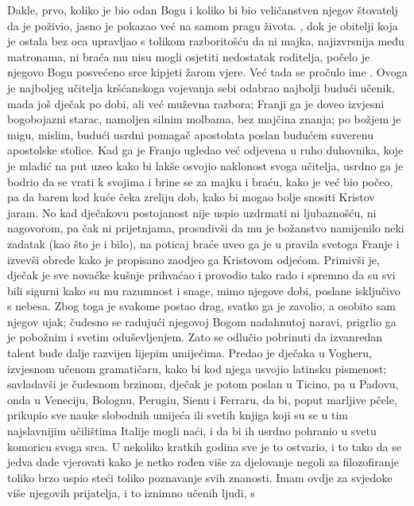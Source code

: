\documentclass[a5paper,twoside]{article}
\begin{document}
Dakle, prvo, koliko je bio odan Bogu i koliko bi bio veličanstven njegov štovatelj da je poživio, jasno je pokazao već na samom pragu života.  , dok je obitelji koja je ostala bez oca upravljao s tolikom razboritošću da ni majka, najizvrsnija među matronama, ni braća mu nisu mogli osjetiti nedostatak roditelja, počelo je njegovo Bogu posvećeno srce kipjeti žarom vjere.  Već tada se pročulo ime .  Ovoga je najboljeg učitelja kršćanskoga vojevanja sebi odabrao najbolji budući učenik, mada još dječak po dobi, ali već muževna razbora; Franji ga je doveo izvjesni bogobojazni starac, namoljen silnim molbama, bez majčina znanja; po božjem je migu, mislim, budući usrdni pomagač apostolata poslan budućem suverenu apostolske stolice.  Kad ga je Franjo ugledao već odjevena u ruho duhovnika, koje je mladić na put uzeo kako bi lakše osvojio naklonost svoga učitelja, usrdno ga je bodrio da se vrati k svojima i brine se za majku i braću, kako je već bio počeo, pa da barem kod kuće čeka zreliju dob, kako bi mogao bolje snositi Kristov jaram.  No kad dječakovu postojanost nije uspio uzdrmati ni ljubaznošću, ni nagovorom, pa čak ni prijetnjama, prosudivši da mu je božanstvo namijenilo neki zadatak (kao što je i bilo), na poticaj braće uveo ga je u pravila svetoga Franje i izvevši obrede kako je propisano zaodjeo ga Kristovom odjećom.  Primivši je, dječak je sve novačke kušnje prihvaćao i provodio tako rado i spremno da su svi bili sigurni kako su mu razumnost i snage, mimo njegove dobi, poslane isključivo s nebesa.  Zbog toga je svakome postao drag, svatko ga je zavolio, a osobito sam njegov ujak; čudesno se radujući njegovoj Bogom nadahnutoj naravi, prigrlio ga je pobožnim i svetim oduševljenjem.  Zato se odlučio pobrinuti da izvanredan talent bude dalje razvijen lijepim umijećima.  Predao je dječaka u Vogheru, izvjesnom učenom gramatičaru, kako bi kod njega usvojio latinsku pismenost; savladavši je čudesnom brzinom, dječak je potom poslan u Ticino, pa u Padovu, onda u Veneciju, Bolognu, Perugiu, Sienu i Ferraru, da bi, poput marljive pčele, prikupio sve nauke slobodnih umijeća ili svetih knjiga koji su se u tim najslavnijim učilištima Italije mogli naći, i da bi ih usrdno pohranio u svetu komoricu svoga srca.  U nekoliko kratkih godina sve je to ostvario, i to tako da se jedva dade vjerovati kako je netko rođen više za djelovanje negoli za filozofiranje toliko brzo uspio steći toliko poznavanje svih znanosti.  Imam ovdje za svjedoke više njegovih prijatelja, i to iznimno učenih ljudi, s 
\end{document}
